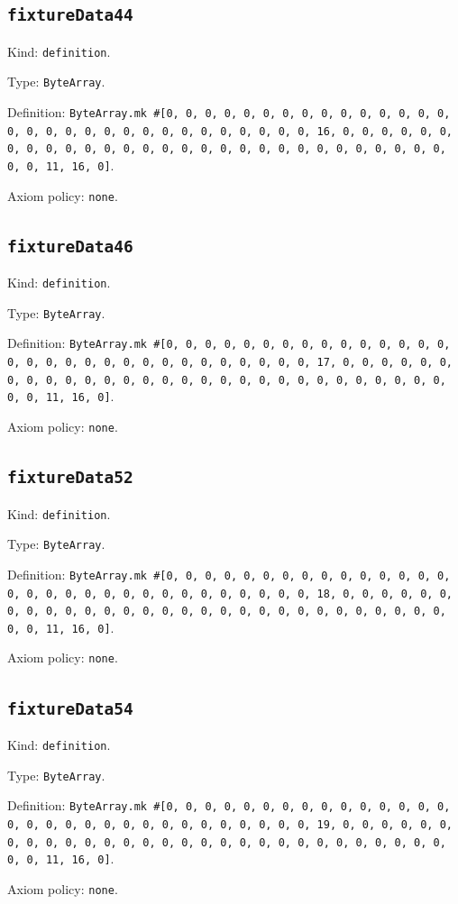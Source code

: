 \documentclass[11pt]{article}
\begin{document}
\subsection*{\texttt{fixtureData44}}
\noindent Kind: \texttt{definition}.\par
\noindent Type: \texttt{ByteArray}.\par
\noindent Definition: \texttt{ByteArray.mk \#[0, 0, 0, 0, 0, 0, 0, 0, 0, 0, 0, 0, 0, 0, 0, 0, 0, 0, 0, 0, 0, 0, 0, 0, 0, 0, 0, 0, 0, 0, 0, 16, 0, 0, 0, 0, 0, 0, 0, 0, 0, 0, 0, 0, 0, 0, 0, 0, 0, 0, 0, 0, 0, 0, 0, 0, 0, 0, 0, 0, 0, 0, 0, 11, 16, 0]}.\par
\noindent Axiom policy: \texttt{none}.\par
\subsection*{\texttt{fixtureData46}}
\noindent Kind: \texttt{definition}.\par
\noindent Type: \texttt{ByteArray}.\par
\noindent Definition: \texttt{ByteArray.mk \#[0, 0, 0, 0, 0, 0, 0, 0, 0, 0, 0, 0, 0, 0, 0, 0, 0, 0, 0, 0, 0, 0, 0, 0, 0, 0, 0, 0, 0, 0, 0, 17, 0, 0, 0, 0, 0, 0, 0, 0, 0, 0, 0, 0, 0, 0, 0, 0, 0, 0, 0, 0, 0, 0, 0, 0, 0, 0, 0, 0, 0, 0, 0, 11, 16, 0]}.\par
\noindent Axiom policy: \texttt{none}.\par
\subsection*{\texttt{fixtureData52}}
\noindent Kind: \texttt{definition}.\par
\noindent Type: \texttt{ByteArray}.\par
\noindent Definition: \texttt{ByteArray.mk \#[0, 0, 0, 0, 0, 0, 0, 0, 0, 0, 0, 0, 0, 0, 0, 0, 0, 0, 0, 0, 0, 0, 0, 0, 0, 0, 0, 0, 0, 0, 0, 18, 0, 0, 0, 0, 0, 0, 0, 0, 0, 0, 0, 0, 0, 0, 0, 0, 0, 0, 0, 0, 0, 0, 0, 0, 0, 0, 0, 0, 0, 0, 0, 11, 16, 0]}.\par
\noindent Axiom policy: \texttt{none}.\par
\subsection*{\texttt{fixtureData54}}
\noindent Kind: \texttt{definition}.\par
\noindent Type: \texttt{ByteArray}.\par
\noindent Definition: \texttt{ByteArray.mk \#[0, 0, 0, 0, 0, 0, 0, 0, 0, 0, 0, 0, 0, 0, 0, 0, 0, 0, 0, 0, 0, 0, 0, 0, 0, 0, 0, 0, 0, 0, 0, 19, 0, 0, 0, 0, 0, 0, 0, 0, 0, 0, 0, 0, 0, 0, 0, 0, 0, 0, 0, 0, 0, 0, 0, 0, 0, 0, 0, 0, 0, 0, 0, 11, 16, 0]}.\par
\noindent Axiom policy: \texttt{none}.\par
\end{document}
